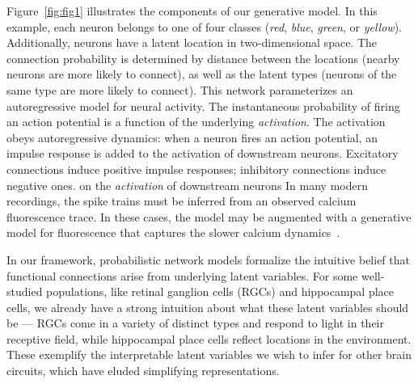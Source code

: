 Figure~\ref{fig:fig1} illustrates the components of our generative model. 
In this example, each neuron belongs to one of four classes (\textit{red}, \textit{blue}, \textit{green}, or \textit{yellow}). Additionally, neurons have a latent location in two-dimensional space. The connection probability is determined by distance between the locations (nearby neurons are more likely to connect), as well as the latent types (neurons of the same type are more likely to connect).
This network parameterizes an autoregressive model for neural activity.
The instantaneous probability of firing an action potential is a function of the underlying \textit{activation}.
The activation obeys autoregressive dynamics: when a neuron fires an action potential, an impulse response is added to the activation of downstream neurons. Excitatory connections induce positive impulse responses; inhibitory connections induce negative ones. 
on the \textit{activation} of downstream neurons
In many modern recordings, the spike trains must be inferred from an observed calcium fluorescence trace. In these cases, the model may be augmented with a generative model for fluorescence 
that captures the slower calcium dynamics~\cite{Vogelstein-2010, Mishchenko11a}. 

In our framework, probabilistic network models formalize the intuitive belief 
that functional connections arise from underlying latent variables. 
For some well-studied populations, like retinal ganglion cells (RGCs) 
and hippocampal place cells, 
we already have a strong intuition about what these latent 
variables should be --- RGCs come in a variety of 
distinct types and respond to light in their receptive field, 
while hippocampal place cells reflect locations 
in the environment. These exemplify the interpretable latent variables 
we wish to infer for other brain circuits, 
which have eluded simplifying representations. 


